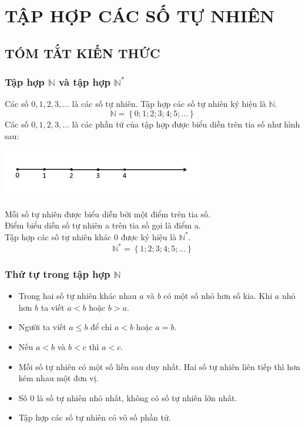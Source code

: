 \section{TẬP HỢP CÁC SỐ TỰ NHIÊN}
\subsection{TÓM TẮT KIẾN THỨC}
\begin{tomtat}
\subsubsection{Tập hợp $\mathbb{N}$ và tập hợp $\mathbb{N}^*$}
Các số $0, 1, 2, 3, …$ là các số tự nhiên. Tập hợp các số tự nhiên ký hiệu là $\mathbb{N}$.\\
$$\mathbb{N} = \left\{ {0;1;2;3;4;5;...} \right\}$$
Các số $0, 1, 2, 3, ...$ là các phần tử của tập hợp được biểu diễn trên tia số như hình sau:
\begin{center}
\includegraphics[scale=1]{img/trucso}
\end{center}
Mỗi số tự nhiên được biểu diễn bởi một điểm trên tia số. \\
Điểm biểu diễn số tự nhiên a trên tia số gọi là điểm a.\\
Tập hợp các số tự nhiên khác $0$ được ký hiệu là $\mathbb{N^*}$.
$${\mathbb{N}^*} = \left\{ {1;2;3;4;5;...} \right\}$$
\subsubsection{Thứ tự trong tập hợp $\mathbb{N}$}
\begin{itemize}
\item Trong hai số tự nhiên khác nhau $a$ và $b$ có một số nhỏ hơn số kia. Khi $a$ nhỏ hơn $b$ ta viết $a < b$ hoặc $b > a$.
\item Người ta viết $a \leq b$ để chỉ $a < b$ hoặc $a = b$.
\item Nếu $a < b$ và $b < c$ thì $a < c$.
\item Mỗi số tự nhiên có một số liền sau duy nhất. Hai số tự nhiên liên tiếp thì hơn kém nhau một đơn vị.
\item Số $0$ là số tự nhiên nhỏ nhất, không có số tự nhiên lớn nhất.
\item Tập hợp các số tự nhiên có vô số phần tử.
\end{itemize}
\end{tomtat}

